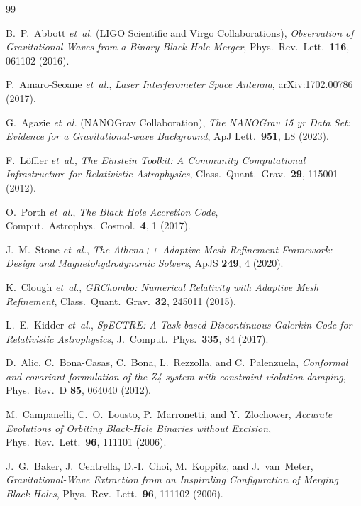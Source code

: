 \documentclass[aps,prd,twocolumn,superscriptaddress,nofootinbib,showpacs,
               longbibliography]{revtex4-2}
\begin{document}
\begin{thebibliography}{99}

B.~P.~Abbott \emph{et~al.} (LIGO Scientific and Virgo Collaborations),
\emph{Observation of Gravitational Waves from a Binary Black Hole Merger},
Phys.\ Rev.\ Lett.\ \textbf{116}, 061102 (2016).

P.~Amaro-Seoane \emph{et~al.},
\emph{Laser Interferometer Space Antenna},
arXiv:1702.00786 (2017).

G.~Agazie \emph{et~al.} (NANOGrav Collaboration),
\emph{The NANOGrav 15 yr Data Set: Evidence for a Gravitational-wave Background},
ApJ Lett.\ \textbf{951}, L8 (2023).

F.~L{\"o}ffler \emph{et~al.},
\emph{The Einstein Toolkit: A Community Computational Infrastructure for Relativistic Astrophysics},
Class.\ Quant.\ Grav.\ \textbf{29}, 115001 (2012).

O.~Porth \emph{et~al.},
\emph{The Black Hole Accretion Code},
Comput.\ Astrophys.\ Cosmol.\ \textbf{4}, 1 (2017).

J.~M.~Stone \emph{et~al.},
\emph{The Athena++ Adaptive Mesh Refinement Framework: Design and Magnetohydrodynamic Solvers},
ApJS \textbf{249}, 4 (2020).

K.~Clough \emph{et~al.},
\emph{GRChombo: Numerical Relativity with Adaptive Mesh Refinement},
Class.\ Quant.\ Grav.\ \textbf{32}, 245011 (2015).

L.~E.~Kidder \emph{et~al.},
\emph{SpECTRE: A Task-based Discontinuous Galerkin Code for Relativistic Astrophysics},
J.\ Comput.\ Phys.\ \textbf{335}, 84 (2017).

D.~Alic, C.~Bona-Casas, C.~Bona, L.~Rezzolla, and C.~Palenzuela,
\emph{Conformal and covariant formulation of the Z4 system with constraint-violation damping},
Phys.\ Rev.\ D \textbf{85}, 064040 (2012).

M.~Campanelli, C.~O.~Lousto, P.~Marronetti, and Y.~Zlochower,
\emph{Accurate Evolutions of Orbiting Black-Hole Binaries without Excision},
Phys.\ Rev.\ Lett.\ \textbf{96}, 111101 (2006).

J.~G.~Baker, J.~Centrella, D.-I.~Choi, M.~Koppitz, and J.~van~Meter,
\emph{Gravitational-Wave Extraction from an Inspiraling Configuration of Merging Black Holes},
Phys.\ Rev.\ Lett.\ \textbf{96}, 111102 (2006).


\end{thebibliography}
\end{document}
